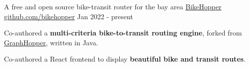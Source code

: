 
\begin{cventries}
  \cventry
    {A free and open source bike-transit router for the bay area}
    { \href{https://bikehopper.org}{BikeHopper} }
    { \href{https://github.com/bikehopper}{github.com/bikehopper} }
    {Jan 2022 - present}
    {
      \begin{cvitems}
        \item {Co-authored a \textbf{multi-criteria bike-to-transit routing engine}, forked from \href{https://graphhopper.com}{GraphHopper}, written in Java.}
        \item {Co-authored a React frontend to display \textbf{beautiful bike and transit routes}.}
      \end{cvitems}
    }
\end{cventries}
